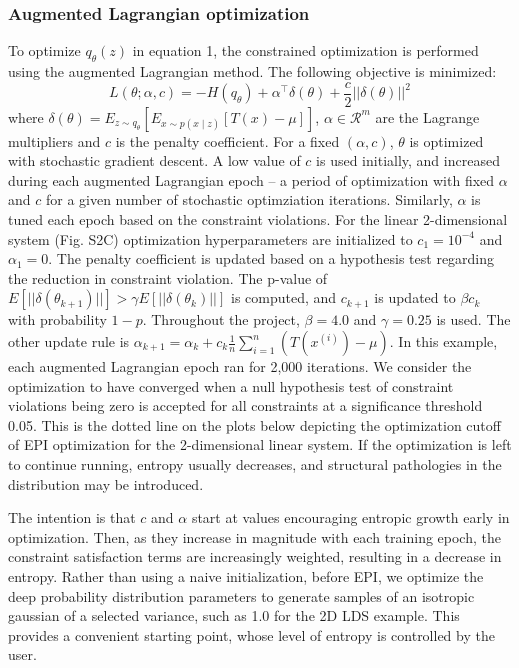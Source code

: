 \documentclass[11pt]{article}
\begin{document}
\subsubsection{Augmented Lagrangian optimization}\label{methods_AL_opt}
To optimize $q_\theta(z)$ in equation 1, the constrained optimization is performed using the augmented Lagrangian method.  The following objective is minimized:
\begin{equation}
L(\theta; \alpha, c) = -H(q_\theta) + \alpha^\top \delta(\theta) + \frac{c}{2}||\delta(\theta)||^2
\end{equation}
where $\delta(\theta) = E_{z \sim q_\theta}\left[ E_{x\sim p(x \mid z)}\left[T(x) - \mu \right] \right]$, $\alpha \in \mathcal{R}^m$ are the Lagrange multipliers and $c$ is the penalty coefficient.  For a fixed $(\alpha, c)$, $\theta$ is optimized with stochastic gradient descent.  A low value of $c$ is used initially, and increased during each augmented Lagrangian epoch -- a period of optimization with fixed $\alpha$ and $c$ for a given number of stochastic optimziation iterations. Similarly, $\alpha$ is tuned each epoch based on the constraint violations.  For the linear 2-dimensional system (Fig. S2C) optimization hyperparameters are initialized to $c_1 = 10^{-4}$ and $\alpha_1 = 0$.  The penalty coefficient is updated based on a hypothesis test regarding the reduction in constraint violation.  The p-value of $E[||\delta(\theta_{k+1})||] > \gamma E[||\delta(\theta_{k})||]$ is computed, and $c_{k+1}$ is updated  to $\beta c_k$ with probability $1-p$.  Throughout the project, $\beta = 4.0$ and $\gamma = 0.25$ is used.  The other update rule is $\alpha_{k+1} = \alpha_k + c_k \frac{1}{n} \sum_{i=1}^n (T(x^{(i)}) - \mu)$.  In this example, each augmented Lagrangian epoch ran for 2,000 iterations.  We consider the optimization to have converged when a null hypothesis test of constraint violations being zero is accepted for all constraints at a significance threshold 0.05.  This is the dotted line on the plots below depicting the optimization cutoff of EPI optimization for the 2-dimensional linear system.  If the optimization is left to continue running, entropy usually decreases, and structural pathologies in the distribution may be introduced.

The intention is that $c$ and $\alpha$ start at values encouraging entropic growth early in optimization.  Then, as they increase in magnitude with each training epoch, the constraint satisfaction terms are increasingly weighted, resulting in a decrease in entropy.  Rather than using a naive initialization, before EPI, we optimize the deep probability distribution parameters to generate samples of an isotropic gaussian of a selected variance, such as 1.0 for the 2D LDS example.  This provides a convenient starting point, whose level of entropy is controlled by the user.
\end{document}
